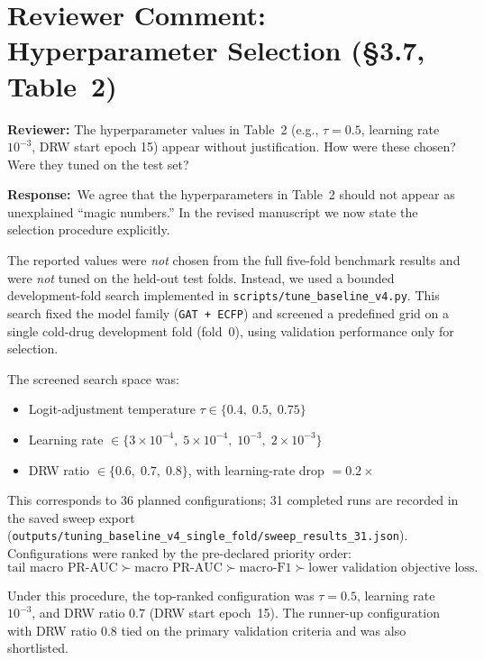 \documentclass[11pt,a4paper]{article}
\newcommand{\reviewer}[1]{\textbf{\textcolor{reviewerbar}{Reviewer:}} #1}
\newcommand{\authorlabel}{\textbf{\textcolor{authorbar}{Response:}}}
\begin{document}
\section{Reviewer Comment: Hyperparameter Selection (\S3.7, Table~2)}

\begin{reviewerbox}
\reviewer{The hyperparameter values in Table~2 (e.g., $\tau = 0.5$,
learning rate $10^{-3}$, DRW start epoch 15) appear without justification.
How were these chosen?
Were they tuned on the test set?}
\end{reviewerbox}

\begin{authorbox}
\authorlabel\
We agree that the hyperparameters in Table~2 should not appear as unexplained
``magic numbers.''
In the revised manuscript we now state the selection procedure explicitly.

The reported values were \emph{not} chosen from the full five-fold benchmark results
and were \emph{not} tuned on the held-out test folds.
Instead, we used a bounded development-fold search implemented in
\texttt{scripts/tune\_baseline\_v4.py}.
This search fixed the model family (\texttt{GAT + ECFP}) and screened a predefined
grid on a single cold-drug development fold (fold~0), using validation performance
only for selection.

The screened search space was:
\begin{itemize}
  \item Logit-adjustment temperature
        $\tau \in \{0.4,\;0.5,\;0.75\}$
  \item Learning rate
        $\in \{3\!\times\!10^{-4},\;5\!\times\!10^{-4},\;10^{-3},\;2\!\times\!10^{-3}\}$
  \item DRW ratio $\in \{0.6,\;0.7,\;0.8\}$, with learning-rate drop $= 0.2\times$
\end{itemize}

This corresponds to 36 planned configurations; 31 completed runs are recorded in
the saved sweep export
(\texttt{outputs/tuning\_baseline\_v4\_single\_fold/sweep\_results\_31.json}).
Configurations were ranked by the pre-declared priority order:
\[
  \text{tail macro PR-AUC}
  \succ \text{macro PR-AUC}
  \succ \text{macro-F1}
  \succ \text{lower validation objective loss.}
\]

Under this procedure, the top-ranked configuration was $\tau = 0.5$,
learning rate $10^{-3}$, and DRW ratio $0.7$ (DRW start epoch~15).
The runner-up configuration with DRW ratio $0.8$ tied on the primary validation
criteria and was also shortlisted.


\end{authorbox}
\end{document}

